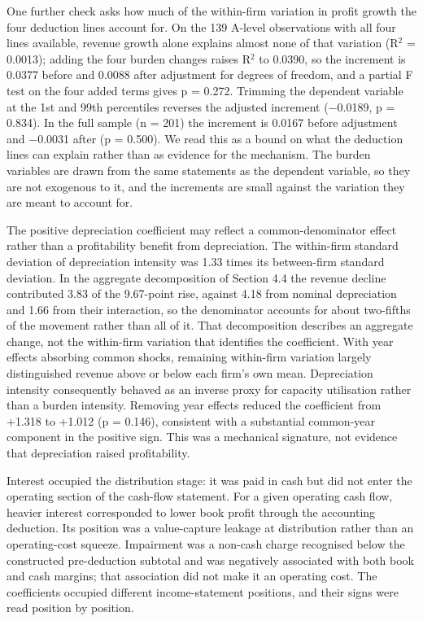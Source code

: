 \documentclass[review,3p,times]{elsarticle}
\begin{document}
One further check asks how much of the within-firm variation in profit growth the four deduction lines account for. On the 139 A-level observations with all four lines available, revenue growth alone explains almost none of that variation (R\ensuremath{^2} = 0.0013); adding the four burden changes raises R\ensuremath{^2} to 0.0390, so the increment is 0.0377 before and 0.0088 after adjustment for degrees of freedom, and a partial F test on the four added terms gives p = 0.272. Trimming the dependent variable at the 1st and 99th percentiles reverses the adjusted increment (\ensuremath{-}0.0189, p = 0.834). In the full sample (n = 201) the increment is 0.0167 before adjustment and \ensuremath{-}0.0031 after (p = 0.500). We read this as a bound on what the deduction lines can explain rather than as evidence for the mechanism. The burden variables are drawn from the same statements as the dependent variable, so they are not exogenous to it, and the increments are small against the variation they are meant to account for.

The positive depreciation coefficient may reflect a common-denominator effect rather than a profitability benefit from depreciation. The within-firm standard deviation of depreciation intensity was 1.33 times its between-firm standard deviation. In the aggregate decomposition of Section 4.4 the revenue decline contributed 3.83 of the 9.67-point rise, against 4.18 from nominal depreciation and 1.66 from their interaction, so the denominator accounts for about two-fifths of the movement rather than all of it. That decomposition describes an aggregate change, not the within-firm variation that identifies the coefficient. With year effects absorbing common shocks, remaining within-firm variation largely distinguished revenue above or below each firm's own mean. Depreciation intensity consequently behaved as an inverse proxy for capacity utilisation rather than a burden intensity. Removing year effects reduced the coefficient from +1.318 to +1.012 (p = 0.146), consistent with a substantial common-year component in the positive sign. This was a mechanical signature, not evidence that depreciation raised profitability.

Interest occupied the distribution stage: it was paid in cash but did not enter the operating section of the cash-flow statement. For a given operating cash flow, heavier interest corresponded to lower book profit through the accounting deduction. Its position was a value-capture leakage at distribution rather than an operating-cost squeeze. Impairment was a non-cash charge recognised below the constructed pre-deduction subtotal and was negatively associated with both book and cash margins; that association did not make it an operating cost. The coefficients occupied different income-statement positions, and their signs were read position by position.
\end{document}
